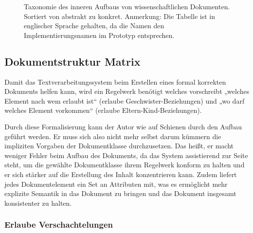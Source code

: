  
\begin{figure}[h!]
\centering
\advance\leftskip-2.5cm
\caption{ Taxonomie des inneren Aufbaus von wissenschaftlichen Dokumenten. Sortiert von abstrakt zu konkret. Anmerkung: Die Tabelle ist in englischer Sprache gehalten, da die Namen den Implementierungsnamen im Prototyp entsprechen. }\label{taxonomie}
\end{figure}
 
\subsection{Dokumentstruktur Matrix}\label{}
 
Damit das Textverarbeitungssystem beim Erstellen eines formal korrekten Dokuments helfen kann, wird ein Regelwerk benötigt welches vorschreibt „welches Element nach wem erlaubt ist“ (erlaube Geschwister-Beziehungen) und „wo darf welches Element vorkommen“ (erlaube Eltern-Kind-Beziehungen).

 
Durch diese Formalisierung kann der Autor wie auf Schienen durch den Aufbau geführt werden. Er muss sich also nicht mehr selbst darum kümmern die impliziten Vorgaben der Dokumentklasse durchzusetzen. Das heißt, er macht weniger Fehler beim Aufbau des Dokuments, da das System assistierend zur Seite steht, um die gewählte Dokumentklasse ihrem Regelwerk konform zu halten und er sich stärker auf die Erstellung des Inhalt konzentrieren kann. Zudem liefert jedes Dokumentelement ein Set an Attributen mit, was es ermöglicht mehr explizite Semantik in das Dokument zu bringen und das Dokument insgesamt konsistenter zu halten.

 
\subsubsection{Erlaube Verschachtelungen}\label{}

